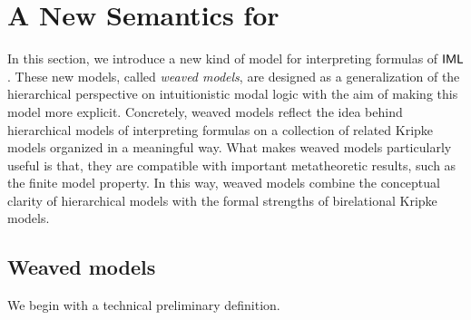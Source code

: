 
\section{A New Semantics for \IML}

In this section, we introduce a new kind of model for interpreting formulas of $\mathsf{IML}$.
These new models, called \emph{weaved models}, are designed as a generalization of the hierarchical perspective on intuitionistic modal logic with the aim of making this model more explicit. Concretely, weaved models reflect the idea behind hierarchical models of interpreting formulas on a collection of related Kripke models organized in a meaningful way.
What makes weaved models particularly useful is that, they are compatible with important metatheoretic results, such as the finite model property. In this way, weaved models combine the conceptual clarity of hierarchical models with the formal strengths of birelational Kripke models.

\subsection{Weaved models}

We begin with a technical preliminary definition.



